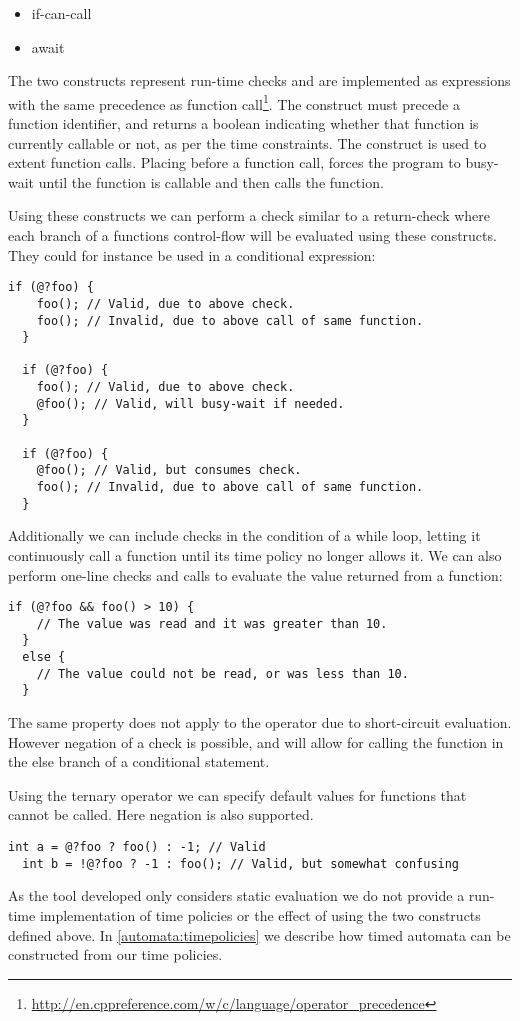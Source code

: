 \begin{itemize}
  \item if-can-call 
  \item await 
\end{itemize}

The two constructs represent run-time checks and are implemented as expressions with the same precedence as function call\footnote{\url{http://en.cppreference.com/w/c/language/operator_precedence}}.
The  construct must precede a function identifier, and returns a boolean indicating whether that function is currently callable or not, as per the time constraints.
The  construct is used to extent function calls. Placing  before a function call, forces the program to busy-wait until the function is callable and then calls the function.

Using these constructs we can perform a check similar to a return-check where each branch of a functions control-flow will be evaluated using these constructs.
They could for instance be used in a conditional expression:
\begin{lstlisting}[style=dlmc]
  if (@?foo) {
    foo(); // Valid, due to above check.
    foo(); // Invalid, due to above call of same function.
  }

  if (@?foo) {
    foo(); // Valid, due to above check.
    @foo(); // Valid, will busy-wait if needed.
  }

  if (@?foo) {
    @foo(); // Valid, but consumes check.
    foo(); // Invalid, due to above call of same function.
  }
\end{lstlisting}
Additionally we can include checks in the condition of a while loop, letting it continuously call a function until its time policy no longer allows it.
We can also perform one-line checks and calls to evaluate the value returned from a function:
\begin{lstlisting}[style=dlmc]
  if (@?foo && foo() > 10) {
    // The value was read and it was greater than 10.
  }
  else {
    // The value could not be read, or was less than 10.
  }
\end{lstlisting}
The same property does not apply to the \dlmc{||} operator due to short-circuit evaluation.
However negation of a  check is possible, and will allow for calling the function in the else branch of a conditional statement.

Using the ternary operator we can specify default values for functions that cannot be called.
Here negation is also supported.

\begin{lstlisting}[style=dlmc]
  int a = @?foo ? foo() : -1; // Valid
  int b = !@?foo ? -1 : foo(); // Valid, but somewhat confusing
\end{lstlisting}


As the tool developed only considers static evaluation we do not provide a run-time implementation of time policies or the effect of using the two constructs defined above.
In \cref{automata:timepolicies} we describe how timed automata can be constructed from our time policies.

